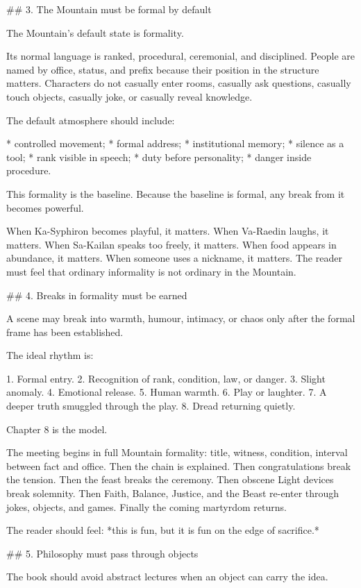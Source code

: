 ## 3. The Mountain must be formal by default

The Mountain’s default state is formality.

Its normal language is ranked, procedural, ceremonial, and disciplined. People are named by office, status, and prefix because their position in the structure matters. Characters do not casually enter rooms, casually ask questions, casually touch objects, casually joke, or casually reveal knowledge.

The default atmosphere should include:

* controlled movement;
* formal address;
* institutional memory;
* silence as a tool;
* rank visible in speech;
* duty before personality;
* danger inside procedure.

This formality is the baseline. Because the baseline is formal, any break from it becomes powerful.

When Ka-Syphiron becomes playful, it matters. When Va-Raedin laughs, it matters. When Sa-Kailan speaks too freely, it matters. When food appears in abundance, it matters. When someone uses a nickname, it matters. The reader must feel that ordinary informality is not ordinary in the Mountain.

## 4. Breaks in formality must be earned

A scene may break into warmth, humour, intimacy, or chaos only after the formal frame has been established.

The ideal rhythm is:

1. Formal entry.
2. Recognition of rank, condition, law, or danger.
3. Slight anomaly.
4. Emotional release.
5. Human warmth.
6. Play or laughter.
7. A deeper truth smuggled through the play.
8. Dread returning quietly.

Chapter 8 is the model.

The meeting begins in full Mountain formality: title, witness, condition, interval between fact and office. Then the chain is explained. Then congratulations break the tension. Then the feast breaks the ceremony. Then obscene Light devices break solemnity. Then Faith, Balance, Justice, and the Beast re-enter through jokes, objects, and games. Finally the coming martyrdom returns.

The reader should feel: *this is fun, but it is fun on the edge of sacrifice.*

## 5. Philosophy must pass through objects

The book should avoid abstract lectures when an object can carry the idea.

